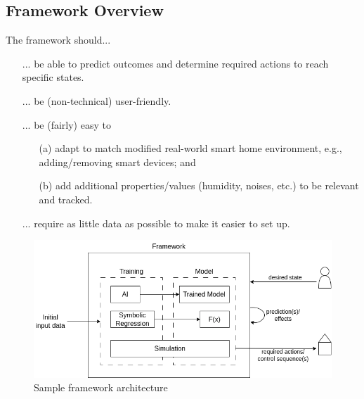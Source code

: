 \documentclass[a4paper,11pt]{article}
\begin{document}
\subsection{Framework Overview}
The framework should...
\begin{itemize}
    \item[...] be able to predict outcomes and determine required actions to reach specific states.
    \item[...] be (non-technical) user-friendly.
    \item[...] be (fairly) easy to 
        \begin{itemize}
            \item[(a)] adapt to match modified real-world smart home environment, e.g., adding/removing smart devices; and
            \item[(b)] add additional properties/values (humidity, noises, etc.) to be relevant and tracked.
        \end{itemize}
    \item[...] require as little data as possible to make it easier to set up.
\end{itemize}

\begin{figure}[h!]
    \centering
    \includegraphics[width=.75\textwidth]{sample_architecture.png}
    \caption{Sample framework architecture}
\end{figure}
\end{document}
